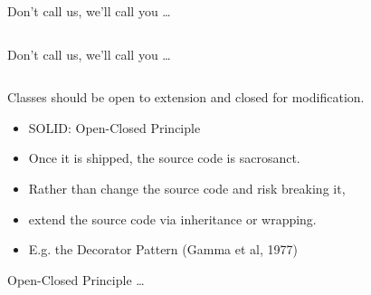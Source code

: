 \documentclass{beamer}
\begin{document}
\begin{frame}{Don't call us, we'll call you \ldots}
    \vspace{0cm}
    \begin{columns}
        \column{\dimexpr\paperwidth-40pt}
        
    \end{columns}
\end{frame}

\begin{frame}{Don't call us, we'll call you \ldots}
    \vspace{0cm}
    \begin{columns}
        \column{\dimexpr\paperwidth-40pt}
        
    \end{columns}
\end{frame}

\begin{frame}{Classes should be open to extension and closed for modification.}
    \begin{itemize}
        \item SOLID: Open-Closed Principle
        \item Once it is shipped, the source code is sacrosanct.
        \item Rather than change the source code and risk breaking it, 
        \item extend the source code via inheritance or wrapping. 
        \item E.g. the Decorator Pattern (Gamma et al, 1977)
    \end{itemize}
\end{frame}

\begin{frame}{Open-Closed Principle \ldots}
    \vspace{0cm}
    \begin{columns}
        \column{\dimexpr\paperwidth-40pt}
        
    \end{columns}
\end{frame}
\end{document}
